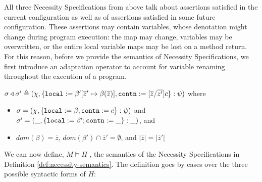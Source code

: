 All three Necessity Specifications from above talk about assertions satisfied in the 
current configuration as well as of assertions satisfied in some future configuration. 
These assertions may contain variables, whose denotation might change during
program execution: the 
map may change, variables may be overwritten, or the entire local variable maps may be lost on a method return.
For this reason, before we provide the semantics of Necessity Specifications, we first introduce an adaptation operator
to account for variable renaming throughout the execution of a program.
\begin{definition}
$\sigma \triangleleft \sigma' \triangleq (\chi, \{{\texttt{local}} := \beta'[\overline{z}' \mapsto \beta(\overline{z})], {\texttt{contn}}:= [\overline{z}/\overline{z'}]c\} : \psi)$
where 
\begin{itemize}
\item
$\sigma = (\chi, \{{\texttt{local}}:=\beta, {\texttt{contn}}:=c\} : \psi)$ and
$\sigma' = (\_, \{{\texttt{local}}:=\beta'; {\texttt{contn}}:=\_\} : \_)$, and
\item
$dom(\beta) = \overline{z}$, $dom(\beta') \cap \overline{z}' = \emptyset$, and $|\overline{z}| = |\overline{z}'|$
\end{itemize}
\end{definition}

We can now define,  $M \models H$ , the semantics of the Necessity Specifications in Definition \ref{def:necessity-semantics}.  The definition goes by cases over the three possible syntactic forms of $H$: 


